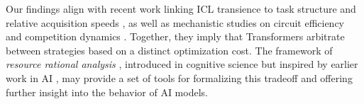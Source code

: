 Our findings align with recent work linking ICL transience to task structure \cite{singh2023transient} and relative acquisition speeds \cite{nguyen_differential_2024,singh_strategy_2025,wurgaft2025context}, as well as mechanistic studies on circuit efficiency  and competition dynamics \cite{thilak_slingshot_2022, nanda_progress_2023, varma_explaining_2023,park2024competition}. Together, they imply that Transformers arbitrate between strategies based on a distinct optimization cost. The framework of {\em resource rational analysis} \cite{lieder2020resource}, introduced in cognitive science but inspired by earlier work in AI \cite{horvitz1987reasoning,russell1994provably}, may provide a set of tools for formalizing this tradeoff and offering further insight into the behavior of AI models. 
